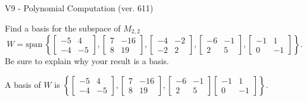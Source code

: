 \begin{exercise}
  \begin{exerciseTitle}V9 - Polynomial Computation (ver. 611)\end{exerciseTitle}
  \begin{exerciseStatement}
    Find a basis for the subspace of \(M_{2,2}\) 
\[W=\mathrm{span}\ \left\{\left[\begin{array}{cc}
-5 & 4 \\
-4 & -5
\end{array}\right] , \left[\begin{array}{cc}
7 & -16 \\
8 & 19
\end{array}\right] , \left[\begin{array}{cc}
-4 & -2 \\
-2 & 2
\end{array}\right] , \left[\begin{array}{cc}
-6 & -1 \\
2 & 5
\end{array}\right] , \left[\begin{array}{cc}
-1 & 1 \\
0 & -1
\end{array}\right]\right\}.\]
 Be sure to explain why your result is a basis.


  \end{exerciseStatement}
  \begin{exerciseAnswer}
   A basis of \(W\) is  \(\left\{\left[\begin{array}{cc}
-5 & 4 \\
-4 & -5
\end{array}\right] , \left[\begin{array}{cc}
7 & -16 \\
8 & 19
\end{array}\right] , \left[\begin{array}{cc}
-6 & -1 \\
2 & 5
\end{array}\right] \left[\begin{array}{cc}
-1 & 1 \\
0 & -1
\end{array}\right]\right\}\).
  


  \end{exerciseAnswer}
\end{exercise}